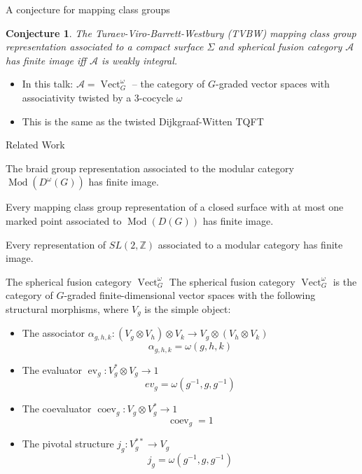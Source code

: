 \documentclass{beamer}
\DeclareMathOperator{\ev}{ev}
\DeclareMathOperator{\coev}{coev}
\DeclareMathOperator{\Vect}{Vect}
\DeclareMathOperator{\Mod}{Mod}
\newtheorem{conj}[theorem]{Conjecture}
\begin{document}
\begin{frame}{A conjecture for mapping class groups}
\begin{conj}
The Turaev-Viro-Barrett-Westbury (TVBW) mapping class group representation associated to a compact surface $\Sigma$ and spherical fusion category $\mathcal A$ has finite image iff $\mathcal A$ is weakly integral.
\end{conj}

\vspace{0.2in}

\begin{itemize}
\pause
\item In this talk: $\mathcal A = \Vect_G^\omega$ -- the category of $G$-graded vector spaces with associativity twisted by a 3-cocycle $\omega$ 
\item This is the same as the twisted Dijkgraaf-Witten TQFT
\end{itemize}

\end{frame}


\begin{frame}{Related Work}
\begin{theorem}
The braid group representation associated to 
the modular category $\Mod(D^\omega(G))$ has finite image.
\end{theorem}

\begin{theorem}
Every mapping class group representation of a closed surface with at most one marked point associated to $\Mod(D(G))$ has finite image.
\end{theorem}

\begin{theorem}[Ng--Schauenberg]
Every representation of $SL(2,\mathbb{Z})$ associated to a modular category has finite image.
\end{theorem}
\end{frame}


\begin{frame}{The spherical fusion category $\Vect^\omega_G$}
  The spherical fusion category $\Vect^\omega_G$ is the category of $G$-graded finite-dimensional vector spaces with the following structural morphisms, where $V_g$ is the simple object:   
\begin{itemize} 
\item The associator $\alpha_{g,h,k}:(V_g \otimes V_h) \otimes V_k \to V_g \otimes (V_h \otimes V_k)$
            $$ \alpha_{g,h,k} = \omega(g,h,k)$$
\item The evaluator $\ev_g:V_g^* \otimes V_g \to 1$
  $$ ev_g = \omega(g^{-1},g,g^{-1})$$
\item The coevaluator $\coev_g:V_g \otimes V_g^* \to 1$
    $$\coev_g = 1$$
\item The pivotal structure $j_g:V_g^{**} \to V_g$
            $$ j_g = \omega(g^{-1},g,g^{-1})$$
\end{itemize}

\end{frame}
\end{document}
